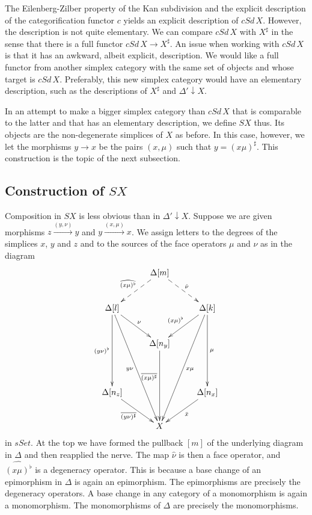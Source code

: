 The Eilenberg-Zilber property of the Kan subdivision and the explicit description of the categorification functor $c$ yields an explicit description of $cSd\, X$. However, the description is not quite elementary. We can compare $cSd\, X$ with $X^\sharp$ in the sense that there is a full functor $cSd\, X\to X^\sharp$. An issue when working with $cSd\, X$ is that it has an awkward, albeit explicit, description. We would like a full functor from another simplex category with the same set of objects and whose target is $cSd\, X$. Preferably, this new simplex category would have an elementary description, such as the descriptions of $X^\sharp$ and $\Delta '\downarrow X$.

In an attempt to make a bigger simplex category than $cSd\, X$ that is comparable to the latter and that has an elementary description, we define $SX$ thus. Its objects are the non-degenerate simplices of $X$ as before. In this case, however, we let the morphisms $y\to x$ be the pairs $(x,\mu )$ such that $y=(x\mu )^\sharp$. This construction is the topic of the next subsection.



\subsection{Construction of $SX$}

Composition in $SX$ is less obvious than in $\Delta '\downarrow X$. Suppose we are given
morphisms $z\xrightarrow{(y,\nu )} y$ and $y\xrightarrow{(x,\mu )} x$. We assign letters to the degrees of the simplices $x$, $y$ and $z$ and to the sources of the face operators $\mu$ and $\nu$ as in the diagram
\begin{displaymath}
\xymatrix@=1em{
&& \Delta [m] \ar@{-->}[lldd]_{\widehat{(x\mu )^\flat } } \ar@{-->}[ddrr]^{\hat{\nu } } \\
\\
\Delta [l] \ar[ddrr]^\nu \ar[ddddd]_{(y\nu )^\flat } \ar[dddddddrr]_{y\nu } &&&& \Delta [k] \ar[lldd]_{(x\mu )^\flat } \ar[ddddd]^\mu \ar[llddddddd]^{x\mu } \\
\\
&& \Delta [n_y] \ar[ddddd]_(.4){\overline{(x\mu )^\sharp } } \\
&&&& \\
\\
\Delta [n_z] \ar[ddrr]_{\overline{(y\nu )^\sharp } } &&&& \Delta [n_x] \ar[lldd]^{\bar{x} } \\
\\
&& X
}
\end{displaymath}
in $sSet$. At the top we have formed the pullback $[m]$ of the underlying diagram in $\Delta$ and then reapplied the nerve. The map $\hat{\nu }$ is then a face operator, and $\widehat{(x\mu )^\flat }$ is a degeneracy operator. This is because a base change of an epimorphism in $\Delta$ is again an epimorphism. The epimorphisms are precisely the degeneracy operators. A base change in any category of a monomorphism is again a monomorphism. The monomorphisms of $\Delta$ are precisely the monomorphisms.

